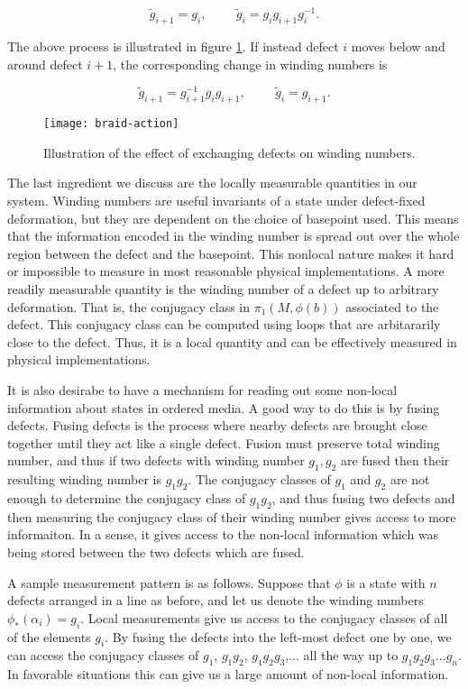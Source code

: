 $$\tilde{g}_{i+1}=g_i,\,\,\,\,\,\,\,\,\,\,\,\,\,\, \tilde{g}_i=g_{i}g_{i+1}g_{i}^{-1}.$$ 

The above process is illustrated in figure \ref{fig:braid-action}. If instead defect $i$ moves below and around defect $i+1$, the corresponding change in winding numbers is 

$$\tilde{g}_{i+1}=g_{i+1}^{-1}g_ig_{i+1},\,\,\,\,\,\,\,\,\,\,\,\,\,\, \tilde{g}_{i}=g_{i+1}.$$ 

\begin{figure}
\begin{center}
\texttt{[image: braid-action]}
\caption{Illustration of the effect of exchanging defects on winding numbers.}
\label{fig:braid-action}
\end{center}
\end{figure}

The last ingredient we discuss are the locally measurable quantities in our system. Winding numbers are useful invariants of a state under defect-fixed deformation, but they are dependent on the choice of basepoint used. This means that the information encoded in the winding number is spread out over the whole region between the defect and the basepoint. This nonlocal nature makes it hard or impossible to measure in most reasonable physical implementations. A more readily measurable quantity is the winding number of a defect up to arbitrary deformation. That is, the conjugacy class in $\pi_1(M,\phi(b))$ associated to the defect. This conjugacy class can be computed using loops that are arbitararily close to the defect. Thus, it is a local quantity and can be effectively measured in physical implementations.

It is also desirabe to have a mechanism for reading out some non-local information about states in ordered media. A good way to do this is by fusing defects. Fusing defects is the process where nearby defects are brought close together until they act like a single defect. Fusion must preserve total winding number, and thus if two defects with winding number $g_1,g_2$ are fused then their resulting winding number is $g_1g_2$. The conjugacy classes of $g_1$ and $g_2$ are not enough to determine the conjugacy class of $g_1g_2$, and thus fusing two defects and then measuring the conjugacy class of their winding number gives access to more informaiton. In a sense, it gives access to the non-local information which was being stored between the two defects which are fused.

A sample measurement pattern is as follows.  Suppose that $\phi$ is a state with $n$ defects arranged in a line as before, and let us denote the winding numbers $\phi_*(\alpha_i)=g_i$. Local measurements give us access to the conjugacy classes of all of the elements $g_i$. By fusing the defects into the left-most defect one by one, we can access the conjugacy classes of $g_1$, $g_1g_2$,  $g_1g_2g_3$,... all the way up to $g_1g_2g_3...g_n$. In favorable situations this can give us a large amount of non-local information.

